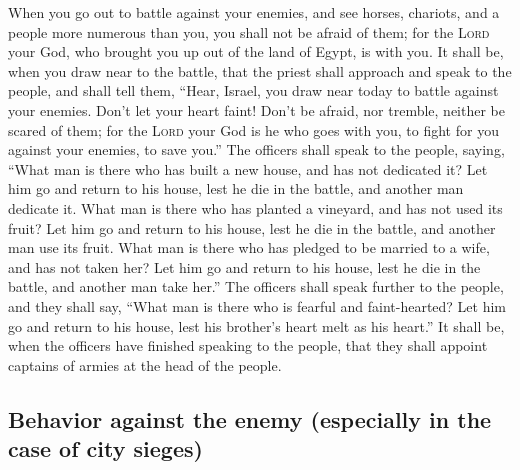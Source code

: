 When you go out to battle against your enemies, and see
horses, chariots, and a people more numerous than you, you shall not be
afraid of them; for the \textsc{Lord} your God, who brought you up out
of the land of Egypt, is with you.  It shall be, when you
draw near to the battle, that the priest shall approach and speak to the
people,  and shall tell them, ``Hear, Israel, you draw
near today to battle against your enemies. Don't let your heart faint!
Don't be afraid, nor tremble, neither be scared of them; 
for the \textsc{Lord} your God is he who goes with you, to fight for you
against your enemies, to save you.''  The officers shall
speak to the people, saying, ``What man is there who has built a new
house, and has not dedicated it? Let him go and return to his house,
lest he die in the battle, and another man dedicate it. 
What man is there who has planted a vineyard, and has not used its
fruit? Let him go and return to his house, lest he die in the battle,
and another man use its fruit.  What man is there who has
pledged to be married to a wife, and has not taken her? Let him go and
return to his house, lest he die in the battle, and another man take
her.''  The officers shall speak further to the people,
and they shall say, ``What man is there who is fearful and
faint-hearted? Let him go and return to his house, lest his brother's
heart melt as his heart.''  It shall be, when the officers
have finished speaking to the people, that they shall appoint captains
of armies at the head of the people.

\hypertarget{behavior-against-the-enemy-especially-in-the-case-of-city-sieges}{%
\subsection{Behavior against the enemy (especially in the case of city
sieges)}\label{behavior-against-the-enemy-especially-in-the-case-of-city-sieges}}

